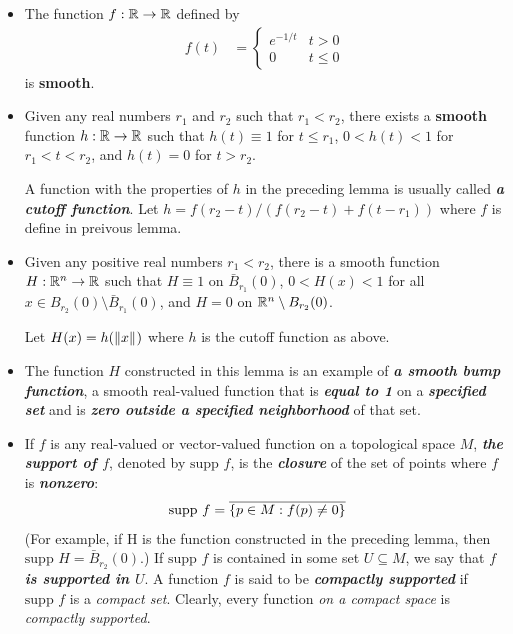 \documentclass[11pt]{article}
\begin{document}
\begin{itemize}
\item \begin{lemma}
The function $f: {\mathbb R} \rightarrow {\mathbb R}$ defined by
\begin{align*}
f(t) &= \left\{\begin{array}{cc}
e^{-1/t} & t > 0 \\
0 & t\le 0
\end{array} \right.
\end{align*} is \textbf{smooth}.
\end{lemma}

\item \begin{lemma}
Given any real numbers $r_1$ and $r_2$ such that $r_1 < r_2$, there exists a \textbf{smooth} function $h: {\mathbb R} \rightarrow {\mathbb R}$ such that $h(t) \equiv 1$ for $t \le r_1$, $0 < h(t) < 1$ for $r_1 < t < r_2$, and $h(t) = 0$ for $t >  r_2$.
\end{lemma} 

A function with the properties of $h$ in the preceding lemma is usually called \emph{\textbf{a cutoff function}}. Let $h = f(r_2 - t)/(f(r_2 -t ) + f(t - r_1))$ where $f$ is define in preivous lemma.

\item \begin{lemma}
Given any positive real numbers $r_1 < r_2$, there is a smooth function $H: {\mathbb R}^n \rightarrow {\mathbb R}$ such that $H \equiv 1$ on $\bar{B}_{r_1}(0)$,  $0 < H(x) < 1$ for all $x \in B_{r_2}(0) \setminus \bar{B}_{r_1}(0)$, and $H = 0$ on ${\mathbb R}^n \setminus B_{r_2}(0)$.
\end{lemma} Let $H(x) = h(\left\|x\right\|_{})$ where $h$ is the cutoff function as above.

\item \begin{definition}
The function $H$ constructed in this lemma is an example of \emph{\textbf{a smooth bump function}}, a smooth real-valued function that is \emph{\textbf{equal to 1}} on a \emph{\textbf{specified set}} and is \emph{\textbf{zero outside a specified neighborhood}} of that set.
\end{definition}

\item \begin{definition}
If $f$ is any real-valued or vector-valued function on a topological space $M$, \emph{\textbf{the support of $f$}}, denoted by $\text{supp }f$, is the \emph{\textbf{closure}} of the set of points where $f$ is \emph{\textbf{nonzero}}:
\begin{align*}
\text{supp }f &= \overline{\left\{p \in M: f(p) \neq 0\right\}}
\end{align*} (For example, if H is the function constructed in the preceding lemma, then $\text{supp }H = \bar{B}_{r_2}(0)$.) If $\text{supp }f$ is contained in some set $U \subseteq M$, we say that \emph{\textbf{$f$ is supported in $U$}}. A function $f$ is said to be \emph{\textbf{compactly supported}} if $\text{supp }f$ is a \emph{compact set}. Clearly, every function \emph{on a compact space} is \emph{compactly supported}.
\end{definition}


\end{itemize}
\end{document}
